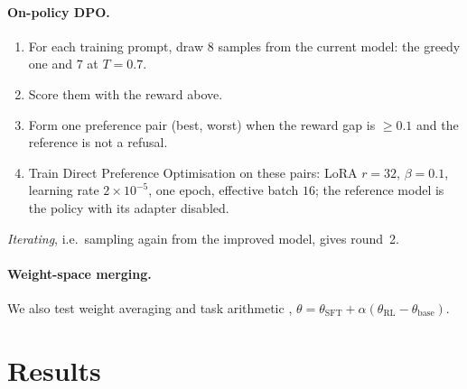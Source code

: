 \documentclass[11pt,a4paper]{article}
\begin{document}
\paragraph{On-policy DPO.}
\begin{enumerate}[leftmargin=*]
\item For each training prompt, draw $8$ samples from the current model: the greedy one and $7$ at $T{=}0.7$.
\item Score them with the reward above.
\item Form one preference pair (best, worst) when the reward gap is $\ge0.1$ and the reference is not a refusal.
\item Train Direct Preference Optimisation \cite{dpo} on these pairs: LoRA $r{=}32$, $\beta{=}0.1$, learning rate $2\!\times\!10^{-5}$, one epoch, effective batch $16$; the reference model is the policy with its adapter disabled.
\end{enumerate}
\emph{Iterating}, i.e.\ sampling again from the improved model, gives round~2.

\paragraph{Weight-space merging.} We also test weight averaging \cite{soups} and task arithmetic \cite{taskarith}, $\theta=\theta_{\mathrm{SFT}}+\alpha(\theta_{\mathrm{RL}}-\theta_{\mathrm{base}})$.

\section{Results}\label{sec:results}
\end{document}
